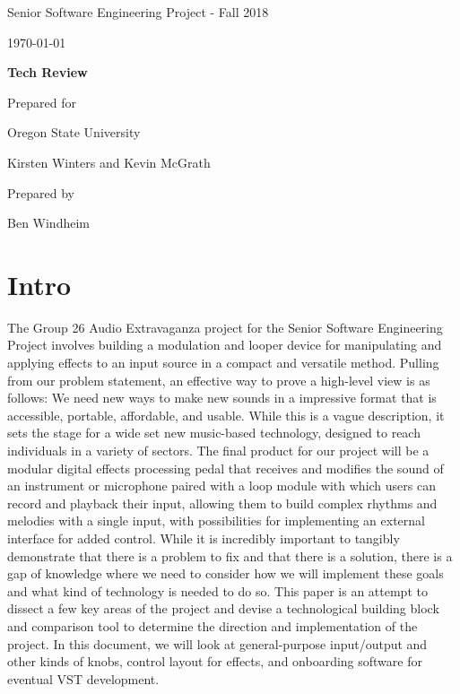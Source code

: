 \documentclass[onecolumn, draftclsnofoot,10pt, compsoc]{IEEEtran}
\newcommand{\NameSigPair}[1]{\par
  \makebox[2.75in][r]{#1} \hfil \makebox[3.25in]{\makebox[2.25in]{\hrulefill} \hfill\makebox[.75in]{\hrulefill}}
\par\vspace{-12pt} \textit{\tiny\noindent
  \makebox[2.75in]{} \hfil\makebox[3.25in]{\makebox[2.25in][r]{Signature} \hfill\makebox[.75in][r]{Date}}}}
\renewcommand{\NameSigPair}[1]{#1}
\begin{document}
\begin{titlepage}
    \begin{singlespace}
        \hfill 
        \par\vspace{.2in}
        \centering
        \scshape{
            \huge Senior Software Engineering Project - Fall 2018 \par
            {\large\today}\par
            \vspace{.5in}
            \textbf{\Huge Tech Review}\par
            \vfill
            {\large Prepared for}\par
            \Huge Oregon State University\par
            \vspace{5pt}
            {\Large\NameSigPair{Kirsten Winters and Kevin McGrath}\par}
            {\large Prepared by }\par
            Ben Windheim\par
            \vspace{5pt}
            \vspace{20pt}
        }
    \end{singlespace}
\end{titlepage}
\newpage
{}

\section{Intro}
	The Group 26 Audio Extravaganza project for the Senior Software Engineering Project involves building a modulation and looper device for manipulating and applying effects to an input source in a compact and versatile method. Pulling from our problem statement, an effective way to prove a high-level view is as follows: We need new ways to make new sounds in a impressive format that is accessible, portable, affordable, and usable. While this is a vague description, it sets the stage for a wide set new music-based technology, designed to reach individuals in a variety of sectors. The final product for our project will be a modular digital effects processing pedal that receives and modifies the sound of an instrument or microphone paired with a loop module with which users can record and playback their input, allowing them to build complex rhythms and melodies with a single input, with possibilities for implementing an external interface for added control. While it is incredibly important to tangibly demonstrate that there is a problem to fix and that there is a solution, there is a gap of knowledge where we need to consider how we will implement these goals and what kind of technology is needed to do so. This paper is an attempt to dissect a few key areas of the project and devise a technological building block and comparison tool to determine the direction and implementation of the project. In this document, we will look at general-purpose input/output and other kinds of knobs, control layout for effects, and onboarding software for eventual VST development.
\end{document}
